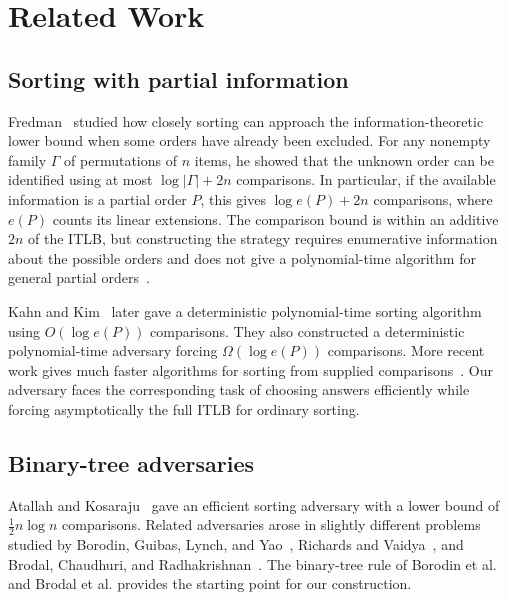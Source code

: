 \section{Related Work}\label{sec:related}\label{sec:related-work}

\subsection{Sorting with partial information}

Fredman~\cite{fredman} studied how closely sorting can approach the
information-theoretic lower bound when some orders have already been
excluded. For any nonempty family $\Gamma$ of permutations of $n$ items,
he showed that the unknown order can be identified using at most
$\log|\Gamma|+2n$ comparisons. In particular, if the available information
is a partial order $P$, this gives $\log e(P)+2n$ comparisons, where
$e(P)$ counts its linear extensions. The comparison bound is within an
additive $2n$ of the ITLB, but constructing the strategy requires
enumerative information about the possible orders and does not give a
polynomial-time algorithm for general partial orders~\cite[p.~390]{kahn-kim}.

Kahn and Kim~\cite{kahn-kim} later gave a deterministic polynomial-time
sorting algorithm using $O(\log e(P))$ comparisons. They also constructed
a deterministic polynomial-time adversary forcing $\Omega(\log e(P))$
comparisons. More recent work gives much faster algorithms for sorting
from supplied comparisons~\cite{haeupler-sorting,rutschmann-sorting}.
Our adversary faces the corresponding task of choosing
answers efficiently while forcing asymptotically the full ITLB for ordinary
sorting.

\subsection{Binary-tree adversaries}

Atallah and Kosaraju~\cite{atallah} gave an efficient sorting adversary with
a lower bound of $\tfrac12 n\log n$ comparisons. Related adversaries arose
in slightly different problems studied by Borodin, Guibas, Lynch, and
Yao~\cite{borodin}, Richards and Vaidya~\cite{richards}, and Brodal,
Chaudhuri, and Radhakrishnan~\cite{brodal}.
The binary-tree rule of Borodin et al. and Brodal et al. provides the
starting point for our construction.

